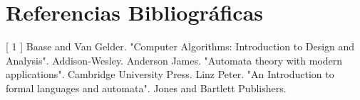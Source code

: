 \section{Referencias Bibliográficas}

[ 1 ] Baase and Van Gelder. "Computer Algorithms: Introduction to Design and Analysis". Addison-Wesley. \hfill \break \break
[ 2 ] Anderson James. "Automata theory with modern applications". Cambridge University Press. \hfill \break \break
[ 3 ] Linz Peter. "An Introduction to formal languages and automata". Jones and Bartlett Publishers.